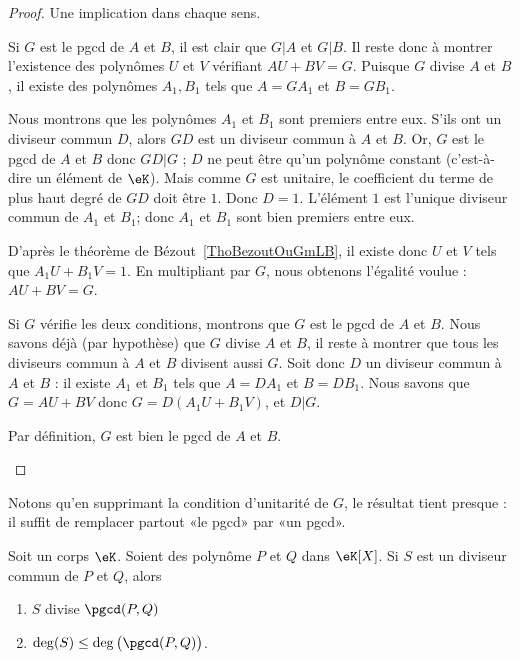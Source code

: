 \begin{proof}
	Une implication dans chaque sens.

	\begin{subproof}
		\spitem[\( \Rightarrow\)]

		Si \( G\) est le pgcd de \( A\) et \( B\), il est clair que \( G|A\) et \( G|B\).  Il reste donc à montrer l'existence des polynômes \( U\) et \( V\) vérifiant \( AU+BV=G\). Puisque \( G\) divise \( A\) et \( B\), il existe des polynômes \( A_1,B_1\) tels que \( A=GA_1\) et \( B=GB_1\).

		Nous montrons que les polynômes \( A_1\) et \( B_1\) sont premiers entre eux. S'ils ont un diviseur commun \( D\), alors \( GD\) est un diviseur commun à \( A\) et \( B\).  Or, \( G\) est le pgcd de \( A\) et \( B\) donc \( GD|G\) ; \( D\) ne peut être qu'un polynôme constant (c'est-à-dire un élément de \( \eK\)). Mais comme \( G\) est unitaire, le coefficient du terme de plus haut degré de \( GD\) doit être \( 1\). Donc \( D=1\).  L'élément \( 1\) est l'unique diviseur commun de \( A_1\) et \( B_1\); donc \( A_1\) et \( B_1\) sont bien premiers entre eux.

		D'après le théorème de Bézout~\ref{ThoBezoutOuGmLB}, il existe donc \( U\) et \( V\) tels que \( A_1U+B_1V=1\). En multipliant par \( G\), nous obtenons l'égalité voulue : \( AU+BV=G\).

		\spitem[\( \Leftarrow\)]

		Si \( G\) vérifie les deux conditions, montrons que \( G\) est le pgcd de \( A\) et \( B\). Nous savons déjà (par hypothèse) que \( G\) divise \( A\) et \( B\), il reste à montrer que tous les diviseurs commun à \( A\) et \( B\) divisent aussi \( G\). Soit donc \( D\) un diviseur commun à \( A\) et \( B\) : il existe \( A_1\) et \( B_1\) tels que \( A=DA_1\) et \( B=DB_1\). Nous savons que \( G=AU+BV\) donc \( G=D(A_1U+B_1V)\), et \( D|G\).

		Par définition, \( G\) est bien le pgcd de \( A\) et \( B\).
	\end{subproof}
\end{proof}
Notons qu'en supprimant la condition d'unitarité de \( G\), le résultat tient presque : il suffit de remplacer partout «le pgcd» par «un pgcd».

\begin{lemma}   \label{LEMooVFBUooLoaOGr}
	Soit un corps \( \eK\).  Soient des polynôme \( P\) et \( Q\) dans \( \eK[X]\). Si \( S\) est un diviseur commun de \( P\) et \( Q\), alors
	\begin{enumerate}
		\item       \label{ITEMooZTCCooPBqzNE}
		      \( S\) divise \( \pgcd(P,Q)\)
		\item       \label{ITEMooIIINooUZVtAb}
		      \( \deg(S)\leq \deg\big( \pgcd(P,Q) \big)\).
	\end{enumerate}
\end{lemma}

